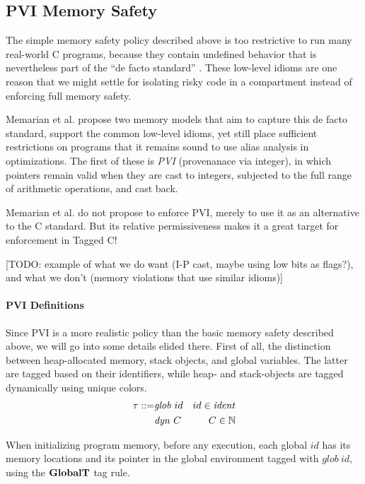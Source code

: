 \documentclass[acmsmall,review,anonymous]{acmart}\settopmatter{printfolios=true,printccs=false,printacmref=false}
\begin{document}
\subsection{PVI Memory Safety}
\label{sec:PVI}

The simple memory safety policy described above is too restrictive to run many real-world
C programs, because they contain undefined behavior that is nevertheless part of the
``de facto standard'' \cite{???}. These low-level idioms are one reason that we might
settle for isolating risky code in a compartment instead of enforcing full memory safety.

Memarian et al. \cite{???} propose two memory models that aim to capture this
de facto standard, support the common low-level idioms, yet still place sufficient
restrictions on programs that it remains sound to use alias analysis in optimizations.
The first of these is {\it PVI} (provenanace via integer), in which pointers remain valid
when they are cast to integers, subjected to the full range of arithmetic operations, and
cast back.

Memarian et al. do not propose to enforce PVI, merely to use it as an alternative to the
C standard. But its relative permissiveness makes it a great target for enforcement in Tagged C!

[TODO: example of what we do want (I-P cast, maybe using low bits as flags?),
  and what we don't (memory violations that use similar idioms)]

\paragraph*{PVI Definitions}

Since PVI is a more realistic policy than the basic memory safety described above,
we will go into some details elided there. First of all, the distinction between
heap-allocated memory, stack objects, and global variables. The latter are tagged
based on their identifiers, while heap- and stack-objects are tagged dynamically
using unique colors.
%
\begin{align*}
  \tau ::= & \mathit{glob} ~ id & id \in \mathit{ident} \\
  & \mathit{dyn} ~ C & C \in \mathbb{N} \\
\end{align*}

When initializing program memory, before any execution, each global \(id\) has its
memory locations and its pointer in the global environment tagged with \(\mathit{glob} ~ id\),
using the \(\mathbf{GlobalT}\) tag rule.
\end{document}
